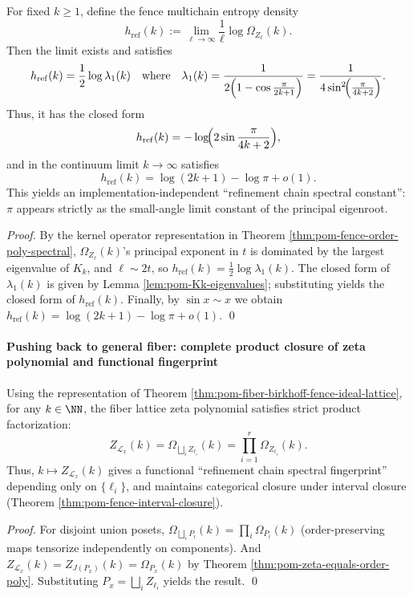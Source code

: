 \begin{corollary}\label{cor:pom-fence-multichain-entropy-pi}
For fixed \(k\ge 1\), define the fence multichain entropy density
\[
h_{\mathrm{ref}}(k):=\lim_{\ell\to\infty}\frac{1}{\ell}\log \Omega_{Z_\ell}(k).
\]
Then the limit exists and satisfies
\[
h_{\mathrm{ref}}(k)=\frac12\log\lambda_1(k)
\quad\text{where}\quad
\lambda_1(k)=\frac{1}{2\Bigl(1-\cos\frac{\pi}{2k+1}\Bigr)}
=\frac{1}{4\sin^2\!\Bigl(\frac{\pi}{4k+2}\Bigr)}.
\]
Thus, it has the closed form
\[
h_{\mathrm{ref}}(k)=-\log\!\Bigl(2\sin\frac{\pi}{4k+2}\Bigr),
\]
and in the continuum limit \(k\to\infty\) satisfies
\[
h_{\mathrm{ref}}(k)=\log(2k+1)-\log\pi+o(1).
\]
This yields an implementation-independent ``refinement chain spectral constant'': \(\pi\) appears strictly as the small-angle limit constant of the principal eigenroot.
\end{corollary}
\begin{proof}
By the kernel operator representation in Theorem \ref{thm:pom-fence-order-poly-spectral}, \(\Omega_{Z_\ell}(k)\)'s principal exponent in \(t\) is dominated by the largest eigenvalue of \(K_k\),
and \(\ell\sim 2t\), so \(h_{\mathrm{ref}}(k)=\frac12\log\lambda_1(k)\).
The closed form of \(\lambda_1(k)\) is given by Lemma \ref{lem:pom-Kk-eigenvalues}; substituting yields the closed form of \(h_{\mathrm{ref}}(k)\).
Finally, by \(\sin x\sim x\) we obtain \(h_{\mathrm{ref}}(k)=\log(2k+1)-\log\pi+o(1)\). \qed
\end{proof}



\paragraph{Pushing back to general fiber: complete product closure of zeta polynomial and functional fingerprint}
\begin{proposition}\label{prop:pom-fiber-zeta-product-fence}
Using the representation of Theorem \ref{thm:pom-fiber-birkhoff-fence-ideal-lattice},
for any \(k\in\NN\), the fiber lattice zeta polynomial satisfies strict product factorization:
\[
Z_{\mathcal L_x}(k)=\Omega_{\bigsqcup_i Z_{\ell_i}}(k)=\prod_{i=1}^r \Omega_{Z_{\ell_i}}(k).
\]
Thus, \(k\mapsto Z_{\mathcal L_x}(k)\) gives a functional ``refinement chain spectral fingerprint'' depending only on \(\{\ell_i\}\),
and maintains categorical closure under interval closure (Theorem \ref{thm:pom-fence-interval-closure}).
\end{proposition}
\begin{proof}
For disjoint union posets, \(\Omega_{\bigsqcup_i P_i}(k)=\prod_i \Omega_{P_i}(k)\) (order-preserving maps tensorize independently on components).
And \(Z_{\mathcal L_x}(k)=Z_{J(P_x)}(k)=\Omega_{P_x}(k)\) by Theorem \ref{thm:pom-zeta-equals-order-poly}.
Substituting \(P_x=\bigsqcup_i Z_{\ell_i}\) yields the result. \qed
\end{proof}


